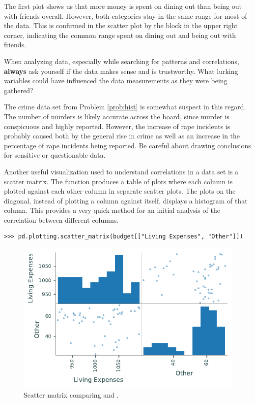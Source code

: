The first plot shows us that more money is spent on dining out than being out with friends overall.
However, both categories stay in the same range for most of the data.
This is confirmed in the scatter plot by the block in the upper right corner, indicating the common range spent on dining out and being out with friends.

\begin{warn}
When analyzing data, especially while searching for patterns and correlations, \textbf{always} ask yourself if the data makes sense and is trustworthy.
What lurking variables could have influenced the data measurements as they were being gathered?

The crime data set from Problem \ref{prob:hist} is somewhat suspect in this regard.
The number of murders is likely accurate across the board, since murder is conspicuous and highly reported.
However, the increase of rape incidents is probably caused both by the general rise in crime as well as an increase in the percentage of rape incidents being reported.
Be careful about drawing conclusions for sensitive or questionable data.
\end{warn}

Another useful visualization used to understand correlations in a data set is a scatter matrix.
The function  produces a table of plots where each column is plotted against each other column in separate scatter plots.
The plots on the diagonal, instead of plotting a column against itself, displays a histogram of that column.
This provides a very quick method for an initial analysis of the correlation between different columns.

\begin{lstlisting}
>>> pd.plotting.scatter_matrix(budget[["Living Expenses", "Other"]])
\end{lstlisting}

\begin{figure}[H]
    \includegraphics[width=.7\textwidth]{figures/scatter_table.pdf}
    \caption{Scatter matrix comparing  and .}
\end{figure}


